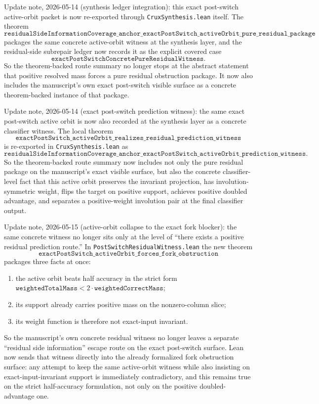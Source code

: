 \documentclass[11pt]{article}
\theoremstyle{remark}
\begin{document}
Update note, 2026-05-14 (synthesis ledger integration): this exact post-switch
active-orbit packet is now re-exported through \texttt{CruxSynthesis.lean}
itself.  The theorem
\[
\texttt{residualSideInformationCoverage\_anchor\_exactPostSwitch\_activeOrbit\_pure\_residual\_package}
\]
packages the same concrete active-orbit witness at the synthesis layer, and
the residual-side subrepair ledger now records it as the explicit covered case
\[
\texttt{exactPostSwitchConcretePureResidualWitness}.
\]
So the theorem-backed route summary no longer stops at the abstract statement
that positive resolved mass forces a pure residual obstruction package.  It now
also includes the manuscript's own exact post-switch visible surface as a
concrete theorem-backed instance of that package.

Update note, 2026-05-14 (exact post-switch prediction witness): the same exact
post-switch active orbit is now also recorded at the synthesis layer as a
concrete classifier witness.  The local theorem
\[
\texttt{exactPostSwitch\_activeOrbit\_realizes\_residual\_prediction\_witness}
\]
is re-exported in \texttt{CruxSynthesis.lean} as
\[
\texttt{residualSideInformationCoverage\_anchor\_exactPostSwitch\_activeOrbit\_prediction\_witness}.
\]
So the theorem-backed route summary now includes not only the pure residual
package on the manuscript's exact visible surface, but also the concrete
classifier-level fact that this active orbit preserves the invariant
projection, has involution-symmetric weight, flips the target on positive
support, achieves positive doubled advantage, and separates a positive-weight
involution pair at the final classifier output.

Update note, 2026-05-15 (active-orbit collapse to the exact fork blocker): the
same concrete witness no longer sits only at the level of ``there exists a
positive residual prediction route.''  In
\texttt{PostSwitchResidualWitness.lean} the new theorem
\[
\texttt{exactPostSwitch\_activeOrbit\_forces\_fork\_obstruction}
\]
packages three facts at once:
\begin{enumerate}[leftmargin=1.5em]
  \item the active orbit beats half accuracy in the strict form
  \(\texttt{weightedTotalMass}<2\cdot\texttt{weightedCorrectMass}\);
  \item its support already carries positive mass on the nonzero-column slice;
  \item its weight function is therefore not exact-input invariant.
\end{enumerate}
So the manuscript's own concrete residual witness no longer leaves a separate
``residual side information'' escape route on the exact post-switch surface.
Lean now sends that witness directly into the already formalized fork
obstruction surface: any attempt to keep the same active-orbit witness while
also insisting on exact-input-invariant support is immediately contradictory,
and this remains true on the strict half-accuracy formulation, not only on the
positive doubled-advantage one.
\end{document}
